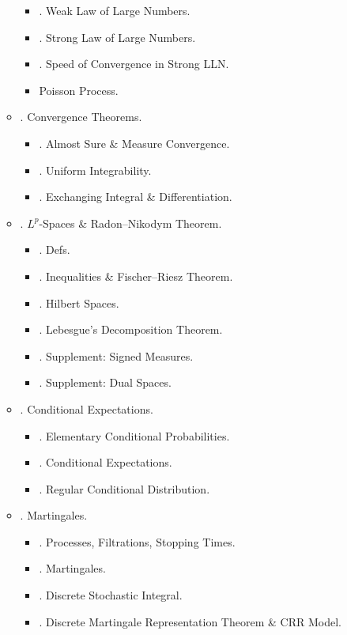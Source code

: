 \documentclass{article}
\begin{document}
\begin{enumerate}
\begin{itemize}
\begin{itemize}
			\item {. Weak Law of Large Numbers.}
			\item {. Strong Law of Large Numbers.}
			\item {. Speed of Convergence in Strong LLN.}
			\item { Poisson Process.}
		\end{itemize}
		\item {. Convergence Theorems.}
		\begin{itemize}
			\item {. Almost Sure \& Measure Convergence.}
			\item {. Uniform Integrability.}
			\item {. Exchanging Integral \& Differentiation.}
		\end{itemize}
		\item {. $L^p$-Spaces \& Radon--Nikodym Theorem.}
		\begin{itemize}
			\item {. Defs.}
			\item {. Inequalities \& Fischer--Riesz Theorem.}
			\item {. Hilbert Spaces.}
			\item {. Lebesgue's Decomposition Theorem.}
			\item {. Supplement: Signed Measures.}
			\item {. Supplement: Dual Spaces.}
		\end{itemize}
		\item {. Conditional Expectations.}
		\begin{itemize}
			\item {. Elementary Conditional Probabilities.}
			\item {. Conditional Expectations.}
			\item {. Regular Conditional Distribution.}
		\end{itemize}
		\item {. Martingales.}
		\begin{itemize}
			\item {. Processes, Filtrations, Stopping Times.}
			\item {. Martingales.}
			\item {. Discrete Stochastic Integral.}
			\item {. Discrete Martingale Representation Theorem \& CRR Model.}
		\end{itemize}

\end{itemize}
\end{enumerate}
\end{document}
